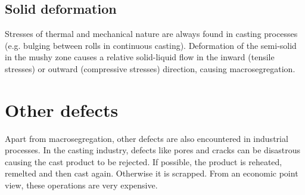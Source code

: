 \subsection{Solid deformation} 
%
Stresses of thermal and mechanical nature are always found in casting processes 
(e.g. bulging between rolls in continuous casting). 
Deformation of the semi-solid in the mushy zone causes a relative solid-liquid 
flow in the inward (tensile stresses) or outward (compressive stresses) direction, causing macrosegregation.
%
\section{Other defects}
%
Apart from macrosegregation, other defects are also encountered in industrial processes. 
In the casting industry, defects like pores and cracks can be disastrous causing the cast product 
to be rejected. If possible, the product is reheated, remelted and then cast again. Otherwise it is scrapped.
From an economic point view, these operations are very expensive.
%
